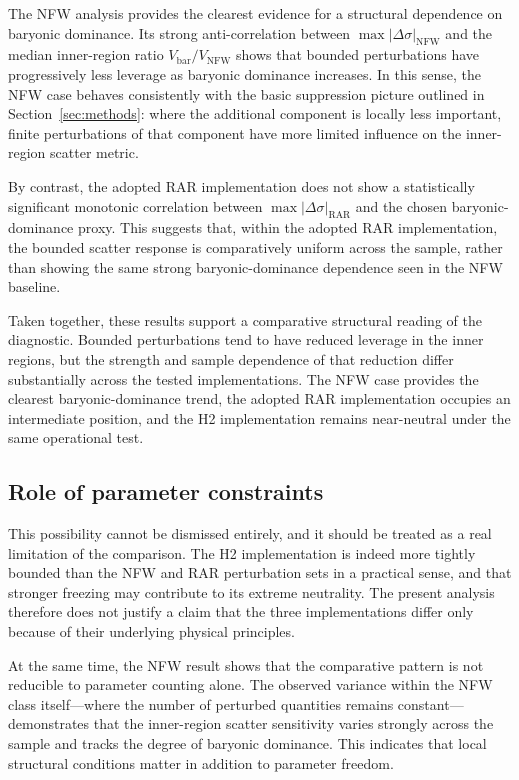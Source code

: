 \documentclass[fleqn,usenatbib]{mnras}
\begin{document}
The NFW analysis provides the clearest evidence for a structural
dependence on baryonic dominance. Its strong anti-correlation between
$\max |\Delta \sigma|_{\mathrm{NFW}}$ and the median inner-region ratio
$V_{\mathrm{bar}}/V_{\mathrm{NFW}}$ shows that bounded perturbations
have progressively less leverage as baryonic dominance increases. In
this sense, the NFW case behaves consistently with the basic
suppression picture outlined in Section~\ref{sec:methods}: where the
additional component is locally less important, finite perturbations of
that component have more limited influence on the inner-region scatter
metric.

By contrast, the adopted RAR implementation does not show a
statistically significant monotonic correlation between
$\max |\Delta \sigma|_{\mathrm{RAR}}$ and the chosen baryonic-dominance
proxy. This suggests that, within the adopted RAR implementation, the
bounded scatter response is comparatively uniform across the sample,
rather than showing the same strong baryonic-dominance dependence seen
in the NFW baseline.

Taken together, these results support a comparative structural reading
of the diagnostic. Bounded perturbations tend to have reduced leverage
in the inner regions, but the strength and sample dependence of that
reduction differ substantially across the tested implementations. The
NFW case provides the clearest baryonic-dominance trend, the adopted
RAR implementation occupies an intermediate position, and the H2
implementation remains near-neutral under the same operational test.

\subsection{Role of parameter constraints}
\label{subsec:parameter_constraints}

This possibility cannot be dismissed entirely, and it should be treated
as a real limitation of the comparison. The H2 implementation is indeed
more tightly bounded than the NFW and RAR perturbation sets in a
practical sense, and that stronger freezing may contribute to its
extreme neutrality. The present analysis therefore does not justify a
claim that the three implementations differ only because of their
underlying physical principles.

At the same time, the NFW result shows that the comparative pattern is
not reducible to parameter counting alone. The observed variance within
the NFW class itself---where the number of perturbed quantities remains
constant---demonstrates that the inner-region scatter sensitivity
varies strongly across the sample and tracks the degree of baryonic
dominance. This indicates that local structural conditions matter in
addition to parameter freedom.
\end{document}
